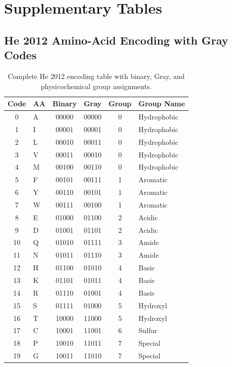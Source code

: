 \appendix
\section{Supplementary Tables}
\label{app:tables}

\subsection{He 2012 Amino-Acid Encoding with Gray Codes}
\begin{table}[ht]
	\centering
	\caption{Complete He 2012 encoding table with binary, Gray, and physicochemical group assignments.}
	\label{tab:he-full}
	\begin{tabular}{clccc l}
		\toprule
		Code & AA & Binary & Gray  & Group & Group Name  \\
		\midrule
		0    & A  & 00000  & 00000 & 0     & Hydrophobic \\
		1    & I  & 00001  & 00001 & 0     & Hydrophobic \\
		2    & L  & 00010  & 00011 & 0     & Hydrophobic \\
		3    & V  & 00011  & 00010 & 0     & Hydrophobic \\
		4    & M  & 00100  & 00110 & 0     & Hydrophobic \\
		5    & F  & 00101  & 00111 & 1     & Aromatic    \\
		6    & Y  & 00110  & 00101 & 1     & Aromatic    \\
		7    & W  & 00111  & 00100 & 1     & Aromatic    \\
		8    & E  & 01000  & 01100 & 2     & Acidic      \\
		9    & D  & 01001  & 01101 & 2     & Acidic      \\
		10   & Q  & 01010  & 01111 & 3     & Amide       \\
		11   & N  & 01011  & 01110 & 3     & Amide       \\
		12   & H  & 01100  & 01010 & 4     & Basic       \\
		13   & K  & 01101  & 01011 & 4     & Basic       \\
		14   & R  & 01110  & 01001 & 4     & Basic       \\
		15   & S  & 01111  & 01000 & 5     & Hydroxyl    \\
		16   & T  & 10000  & 11000 & 5     & Hydroxyl    \\
		17   & C  & 10001  & 11001 & 6     & Sulfur      \\
		18   & P  & 10010  & 11011 & 7     & Special     \\
		19   & G  & 10011  & 11010 & 7     & Special     \\
		\bottomrule
	\end{tabular}
\end{table}


